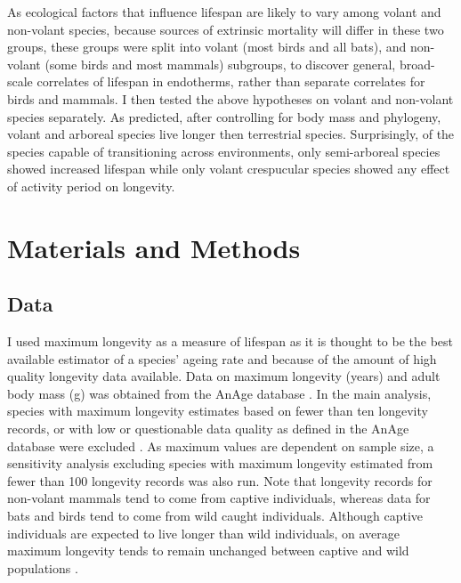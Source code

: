 As ecological factors that influence lifespan are likely to vary among volant and non-volant species, because sources of extrinsic mortality will differ in these two groups, these groups were split into volant (most birds and all bats), and non-volant (some birds and most mammals) subgroups, to discover general, broad-scale correlates of lifespan in endotherms, rather than separate correlates for birds and mammals. I then tested the above hypotheses on volant and non-volant species separately. As predicted, after controlling for body mass and phylogeny, volant and arboreal species live longer then terrestrial species. Surprisingly, of the species capable of transitioning across environments, only semi-arboreal species showed increased lifespan while only volant crespucular species showed any effect of activity period on longevity.

\section{Materials and Methods}
\subsection{Data}

I used maximum longevity as a measure of lifespan as it is thought to be the best available estimator of a species' ageing rate \citep{de2007analysis} and because of the amount of high quality longevity data available. Data on maximum longevity (years) and adult body mass (g) was obtained from the AnAge database \citep{de2009database,tacutu2012human}. In the main analysis, species with maximum longevity estimates based on fewer than ten longevity records, or with low or questionable data quality as defined in the AnAge database were excluded \citep{de2007analysis}. As maximum values are dependent on sample size, a sensitivity analysis excluding species with maximum longevity estimated from fewer than 100 longevity records was also run. Note that longevity records for non-volant mammals tend to come from captive individuals, whereas data for bats and birds tend to come from wild caught individuals. Although captive individuals are expected to live longer than wild individuals, on average maximum longevity tends to remain unchanged between captive and wild populations \citep{ricklefs2001comparison}.

